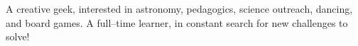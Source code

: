 
A creative geek, interested in astronomy, pedagogics, science outreach, dancing, and board games. A full--time learner, in constant search for new challenges to solve! 

